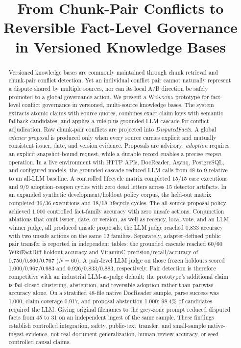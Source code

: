 \documentclass[conference]{IEEEtran}
\title{From Chunk-Pair Conflicts to Reversible Fact-Level Governance in Versioned Knowledge Bases}
\author{\IEEEauthorblockN{Anonymous Author(s)}
\IEEEauthorblockA{Paper under anonymous review}}
\author{\IEEEauthorblockN{Author Name}
\IEEEauthorblockA{Department / Institution\\
City, Country\\
email@example.edu}}
\newcommand{\sys}{\textsc{WeKnora}}
\newcommand{\disputedfact}{\textit{DisputedFact}}
\newcommand{\proposal}{\textit{winner proposal}}
\newcommand{\adoption}{\textit{adoption}}
\newcommand{\reopen}{\textit{reopen}}
\begin{document}
\maketitle

\begin{abstract}
Versioned knowledge bases are commonly maintained through chunk retrieval and chunk-pair conflict detection. Yet an individual conflict pair cannot naturally represent a dispute shared by multiple sources, nor can its local A/B direction be safely promoted to a global governance action. We present a \sys{} prototype for fact-level conflict governance in versioned, multi-source knowledge bases. The system extracts atomic claims with source quotes, combines exact claim keys with semantic fallback candidates, and applies a rule-plus-grounded-LLM cascade for conflict adjudication. Raw chunk-pair conflicts are projected into \disputedfact{}s. A global \proposal{} is produced only when every source carries explicit and mutually consistent issuer, date, and version evidence. Proposals are advisory: \adoption{} requires an explicit snapshot-bound request, while a durable record enables a precise \reopen{} operation. In a live environment with HTTP APIs, DocReader, Asynq, PostgreSQL, and configured models, the grounded cascade reduced LLM calls from 48 to 9 relative to an all-LLM baseline. A controlled lifecycle matrix completed 15/15 case executions and 9/9 adoption--reopen cycles with zero dead letters across 15 detector artifacts. In an expanded synthetic development/holdout policy corpus, the held-out matrix completed 36/36 executions and 18/18 lifecycle cycles. The all-source proposal policy achieved 1.000 controlled fact-family accuracy with zero unsafe actions. Conjunction ablations that omit issuer, date, or version, as well as recency, local-vote, and an LLM winner judge, all produced unsafe proposals; the LLM judge reached 0.833 accuracy with two unsafe actions on the same 12 families. Separately, adapter-defined public pair transfer is reported in independent tables: the grounded cascade reached 60/60 WikiFactDiff holdout accuracy and VitaminC precision/recall/accuracy of 0.750/0.800/0.767 ($N{=}60$). A pair-level LLM judge on those frozen holdouts scored 1.000/0.967/0.983 and 0.926/0.833/0.883, respectively. Pair detection is therefore competitive with an industrial LLM-as-judge default; the prototype's additional claim is fail-closed clustering, abstention, and reversible adoption rather than pairwise accuracy alone. On a stratified 48-file native DocReader sample, parse success was 1.000, claim coverage 0.917, and proposal abstention 1.000; 98.4\% of candidates required the LLM. Giving original filenames to the grey-zone prompt reduced disputed facts from 45 to 31 on an independent ingest of the same sample. These findings establish controlled integration, safety, public-text transfer, and small-sample native-ingest evidence, not real-document generalization, human-review accuracy, or seed-controlled causal claims.
\end{abstract}
\end{document}
